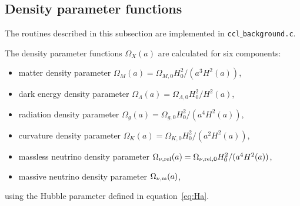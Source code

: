 \documentclass[\docopts]{\docclass}
\begin{document}
\subsection{Density parameter functions}
\label{subsec:densityparam}

The routines described in this subsection are implemented in {\tt ccl$\_$background.c}.

The density parameter functions $\Omega_X(a)$ are calculated for six components:
\begin{itemize}
\item matter density parameter $\Omega_M(a) = \Omega_{M,0} H_0^2 / (a^3 H^2(a) )$,
\item dark energy density parameter $\Omega_\Lambda(a) = \Omega_{\Lambda,0} H_0^2 / H^2(a)$,
\item radiation density parameter $\Omega_g(a) = \Omega_{g,0} H_0^2 / (a^4 H^2(a) )$,
\item curvature density parameter $\Omega_K(a) = \Omega_{K,0} H_0^2 / (a^2 H^2(a) )$,
\item massless neutrino density parameter $\Omega_{\nu, {\rm rel}}(a) = \Omega_{\nu, {\rm rel},0} H_0^2 / (a^4 H^2(a) )$,
\item massive neutrino density parameter $\Omega_{\nu, {\rm m}}(a)$,
\end{itemize}
using the Hubble parameter defined in equation~\ref{eq:Ha}.
\end{document}
